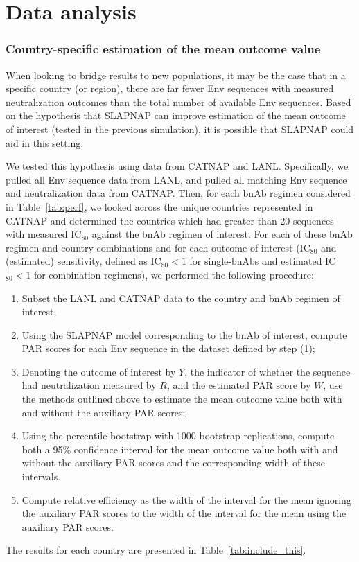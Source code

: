 \documentclass[10pt]{article}
\begin{document}
\section{Data analysis}

\subsubsection{Country-specific estimation of the mean outcome value}
When looking to bridge results to new populations, it may be the case that in a specific country (or region), there are far fewer Env sequences with measured neutralization outcomes than the total number of available Env sequences. Based on the hypothesis that SLAPNAP can improve estimation of the mean outcome of interest (tested in the previous simulation), it is possible that SLAPNAP could aid in this setting.

We tested this hypothesis using data from CATNAP and LANL. Specifically, we pulled all Env sequence data from LANL, and pulled all matching Env sequence and neutralization data from CATNAP. Then, for each bnAb regimen considered in Table~\ref{tab:perf}, we looked across the unique countries represented in CATNAP and determined the countries which had greater than 20 sequences with measured IC$_{80}$ against the bnAb regimen of interest. For each of these bnAb regimen and country combinations and for each outcome of interest (IC$_{80}$ and (estimated) sensitivity, defined as IC$_{80} < 1$ for single-bnAbs and estimated IC$_{80} < 1$ for combination regimens), we performed the following procedure:
\begin{enumerate}
    \item Subset the LANL and CATNAP data to the country and bnAb regimen of interest;
    \item Using the SLAPNAP model corresponding to the bnAb of interest, compute PAR scores for each Env sequence in the dataset defined by step (1);
    \item Denoting the outcome of interest by $Y$, the indicator of whether the sequence had neutralization measured by $R$, and the estimated PAR score by $W$, use the methods outlined above to estimate the mean outcome value both with and without the auxiliary PAR scores;
    \item Using the percentile bootstrap with 1000 bootstrap replications, compute both a 95\% confidence interval for the mean outcome value both with and without the auxiliary PAR scores and the corresponding width of these intervals.
    \item Compute relative efficiency as the width of the interval for the mean ignoring the auxiliary PAR scores to the width of the interval for the mean using the auxiliary PAR scores.
\end{enumerate}
The results for each country are presented in Table~\ref{tab:include_this}.
\end{document}
